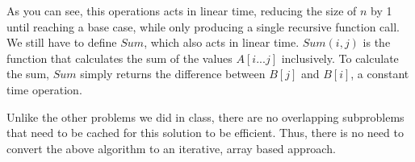 \documentclass[12pt]{article}
\begin{document}
As you can see, this operations acts in linear time, reducing the size of $n$ by 1 until reaching a base case, while only producing a single recursive function call. We still have to define $Sum$, which also acts in linear time. $Sum(i, j)$ is the function that calculates the sum of the values $A[i...j]$ inclusively. To calculate the sum, $Sum$ simply returns the difference between $B[j]$ and $B[i]$, a constant time operation.

Unlike the other problems we did in class, there are no overlapping subproblems that need to be cached for this solution to be efficient. Thus, there is no need to convert the above algorithm to an iterative, array based approach.
\end{document}
